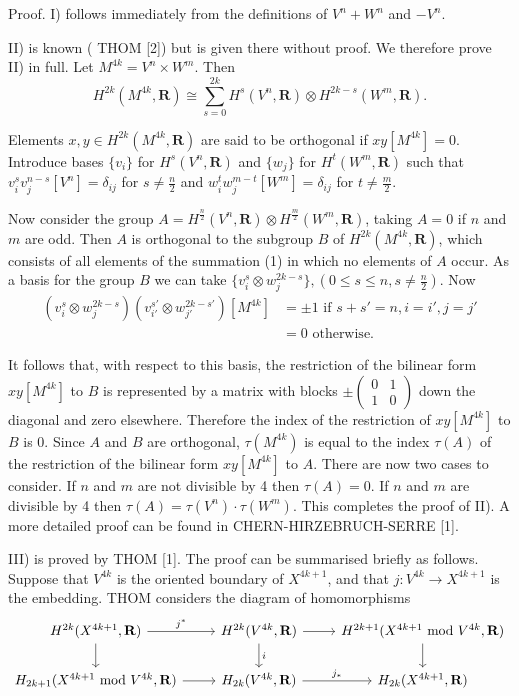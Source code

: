 \documentclass{book}
\begin{document}
\begin{Proof}
Proof. I) follows immediately from the definitions of $V^n + W^n$ and $-V^n$.

II) is known ({\color{red} THOM [2]}) but is given there without proof. We therefore prove II) in full. Let $M^{4k} = V^n \times W^m$. Then
\[
    H^{2k}(M^{4k}, \mathbf{R}) \cong \sum_{s=0}^{2k} H^s(V^n, \mathbf{R}) \otimes H^{2k-s}(W^m, \mathbf{R}).
\]

Elements $x, y \in H^{2k}(M^{4k}, \mathbf{R})$ are said to be orthogonal if $x y[M^{4k}] = 0$. Introduce bases $\{v_i\}$ for $H^s(V^n, \mathbf{R})$ and $\{w_j\}$ for $H^t(W^m, \mathbf{R})$ such that $v_i^s v_j^{n-s}[V^n] = \delta_{ij}$ for $s \neq \frac{n}{2}$ and $w_i^t w_j^{m-t}[W^m] = \delta_{ij}$ for $t \neq \frac{m}{2}$.

Now consider the group $A = H^{\frac{n}{2}}(V^n, \mathbf{R}) \otimes H^{\frac{m}{2}}(W^m, \mathbf{R})$, taking $A = 0$ if $n$ and $m$ are odd. Then $A$ is orthogonal to the subgroup $B$ of $H^{2k}(M^{4k}, \mathbf{R})$, which consists of all elements of the summation (1) in which no elements of $A$ occur. As a basis for the group $B$ we can take $\{v_i^s \otimes w_j^{2k-s}\}, (0 \leq s \leq n, s \neq \frac{n}{2})$. Now
\begin{align*}
(v_i^s \otimes w_j^{2k-s})(v_{i'}^{s'} \otimes w_{j'}^{2k-s'})[M^{4k}] &= \pm 1 \text{ if } s + s' = n, i = i', j = j' \\
&= 0 \text{ otherwise.}
\end{align*}

It follows that, with respect to this basis, the restriction of the bilinear form $x y[M^{4k}]$ to $B$ is represented by a matrix with blocks $\pm \begin{pmatrix} 0 & 1 \\ 1 & 0 \end{pmatrix}$ down the diagonal and zero elsewhere. Therefore the index of the restriction of $x y[M^{4k}]$ to $B$ is 0. Since $A$ and $B$ are orthogonal, $\tau(M^{4k})$ is equal to the index $\tau(A)$ of the restriction of the bilinear form $x y[M^{4k}]$ to $A$. There are now two cases to consider. If $n$ and $m$ are not divisible by 4 then $\tau(A) = 0$. If $n$ and $m$ are divisible by 4 then $\tau(A) = \tau(V^n) \cdot \tau(W^m)$. This completes the proof of II). A more detailed proof can be found in {\color{red} CHERN-HIRZEBRUCH-SERRE [1]}.

III) is proved by {\color{red} THOM [1]}. The proof can be summarised briefly as follows. Suppose that $V^{4k}$ is the oriented boundary of $X^{4k+1}$, and that $j: V^{4k} \to X^{4k+1}$ is the embedding. THOM considers the diagram of homomorphisms
\[
\begin{tikzcd}
H^{2k}(X^{4k+1}, \mathbf{R}) \arrow[r, "j^*"] \arrow[d] & H^{2k}(V^{4k}, \mathbf{R}) \arrow[r] \arrow[d, "i"] & H^{2k+1}(X^{4k+1} \text{ mod } V^{4k}, \mathbf{R}) \arrow[d] \\
H_{2k+1}(X^{4k+1} \text{ mod } V^{4k}, \mathbf{R}) \arrow[r] & H_{2k}(V^{4k}, \mathbf{R}) \arrow[r, "j_*"] & H_{2k}(X^{4k+1}, \mathbf{R})
\end{tikzcd}
\]


\end{Proof}
\end{document}
